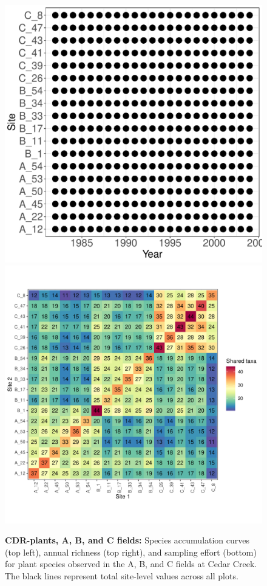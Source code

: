 \documentclass[11pt, oneside]{article}
\begin{document}
\begin{figure}[h!]
\includegraphics[scale = 0.4]{cdr-plantsABC-compagnoni_spatiotemporal_sampling_effort.pdf}
\includegraphics[scale = 0.4]{cdr-plantsABC-compagnoni_spp_shared.pdf}
\caption{{\bf CDR-plants, A, B, and C fields:} Species accumulation curves (top left),  annual richness (top right), and sampling effort (bottom)  for plant species observed in the A, B, and C fields at Cedar Creek. The black lines represent total site-level values across all plots.}
\label{cdrABC-plants}
\end{figure}
\end{document}
